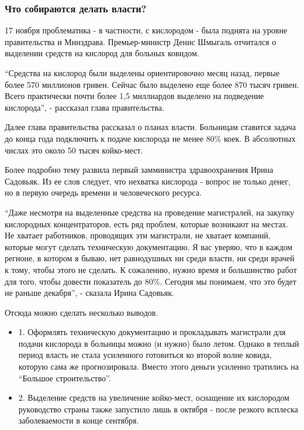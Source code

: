  
 
 
 
 

\subsubsection{Что собираются делать власти?}
\label{sec:18_11_2020.news.ua.strana.romanova_maria.1.draki_kislorod_kovid.vlasti}

17 ноября проблематика - в частности, с кислородом - была поднята на уровне правительства и Минздрава. Премьер-министр Денис Шмыгаль отчитался о выделении средств на кислород для больных ковидом.

\enquote{Средства на кислород были выделены ориентировочно месяц назад, первые более
570 миллионов гривен. Сейчас было выделено еще более 870 тысяч гривен. Всего
практически почти более 1,5 миллиардов выделено на подведение кислорода}, -
рассказал глава правительства.

Далее глава правительства рассказал о планах власти. Больницам ставится задача
до конца года подключить к подаче кислорода не менее 80\% коек. В абсолютных
числах это около 50 тысяч койко-мест. 

Более подробно тему развила первый замминистра здравоохранения Ирина Садовьяк.
Из ее слов следует, что нехватка кислорода - вопрос не только денег, но в
первую очередь времени и человеческого ресурса. 

\enquote{Даже несмотря на выделенные средства на проведение магистралей, на закупку
кислородных концентраторов, есть ряд проблем, которые возникают на местах. Не
хватает работников, проводящих эти магистрали, не хватает компаний, которые
могут сделать техническую документацию. Я вас уверяю, что в каждом регионе, в
котором я бываю, нет равнодушных ни среди власти, ни среди врачей к тому, чтобы
этого не сделать. К сожалению, нужно время и большинство работ для того, чтобы
довести показатель до 80\%. Сегодня мы понимаем, что это будет не раньше
декабря}, - сказала Ирина Садовьяк. 

Отсюда можно сделать несколько выводов. 

\begin{itemize}
\item 1. Оформлять техническую документацию и прокладывать магистрали для
				подачи кислорода в больницы можно (и нужно) было летом. Однако в теплый
				период власть не стала усиленного готовиться ко второй волне ковида,
				которую сама же прогнозировала. Вместо этого деньги усиленно тратились
				на \enquote{Большое строительство}. 

\item 2. Выделение средств на увеличение койко-мест, оснащение их кислородом
				руководство страны также запустило лишь в октября  - после резкого
				всплеска заболеваемости в конце сентября. 
\end{itemize}

